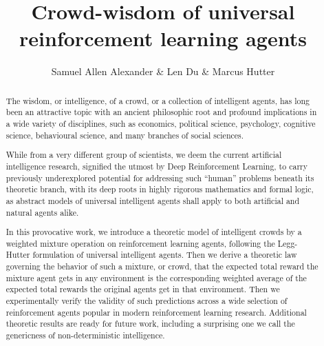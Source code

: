 \documentclass{article}
\begin{document}
\title{ Crowd-wisdom of universal reinforcement learning agents }
\author{Samuel Allen Alexander \& Len Du \& Marcus Hutter}


\maketitle

\begin{abstract}
The wisdom, or intelligence, of a crowd, or a collection of intelligent agents, has long been an attractive topic with an ancient philosophic root and profound implications in a wide variety of disciplines, such as economics, political science, psychology, cognitive science, behavioural science, and many branches of social sciences.

While from a very different group of scientists, we deem the current artificial intelligence research,
signified the utmost by Deep Reinforcement Learning,
to carry previously underexplored potential for addressing such ``human'' problems beneath its theoretic branch,
with its deep roots in highly rigorous mathematics and formal logic,
as abstract models of universal intelligent agents shall apply to both artificial and natural agents alike.

In this provocative work, we introduce a theoretic model of intelligent crowds by
 a weighted mixture operation on
reinforcement learning agents, following the Legg-Hutter formulation of universal intelligent agents.
Then we derive a theoretic law governing the behavior of such a mixture, or crowd, that  
the expected total reward the mixture agent
gets in any environment is the corresponding weighted average
of the expected total rewards the original agents get in that
environment. Then we experimentally verify the validity of such predictions across a wide selection of reinforcement agents popular in modern reinforcement learning research. Additional theoretic results are ready for future work,
including a surprising one
 we call the genericness of non-deterministic intelligence.

\end{abstract}

%
%
\end{document}
